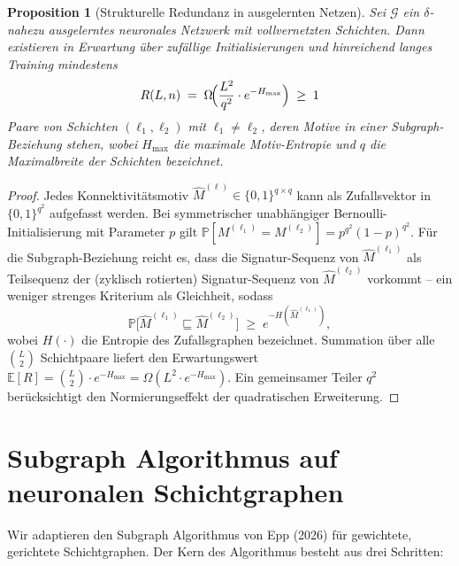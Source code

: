 \documentclass[12pt, a4paper, openany]{report}
\newtheorem{proposition}[theorem]{Proposition}
\newcommand{\E}{\mathbb{E}}
\newcommand{\Prob}{\mathbb{P}}
\newcommand{\calG}{\mathcal{G}}
\begin{document}
\begin{proposition}[Strukturelle Redundanz in ausgelernten Netzen]
\label{prop:redundancy}
Sei $\calG$ ein $\delta$-nahezu ausgelerntes neuronales Netzwerk mit
vollvernetzten Schichten.  Dann existieren in Erwartung über zufällige
Initialisierungen und hinreichend langes Training mindestens
\[
  R(L, n)
  \;=\;
  \Omega\!\Bigl(\frac{L^2}{q^2} \cdot e^{-H_{\max}}\Bigr)
  \;\geq\; 1
\]
Paare von Schichten $(\ell_1, \ell_2)$ mit $\ell_1 \neq \ell_2$, deren
Motive in einer Subgraph-Beziehung stehen, wobei $H_{\max}$ die maximale
Motiv-Entropie und $q$ die Maximalbreite der Schichten bezeichnet.
\end{proposition}

\begin{proof}
Jedes Konnektivitätsmotiv $\hat{M}^{(\ell)} \in \{0,1\}^{q\times q}$ kann
als Zufallsvektor in $\{0,1\}^{q^2}$ aufgefasst werden.  Bei symmetrischer
unabhängiger Bernoulli-Initialisierung mit Parameter $p$ gilt
$\Prob[M^{(\ell_1)} = M^{(\ell_2)}] = p^{q^2}(1-p)^{q^2}$.  Für die
Subgraph-Beziehung reicht es, dass die Signatur-Sequenz von $\hat{M}^{(\ell_1)}$
als Teilsequenz der (zyklisch rotierten) Signatur-Sequenz von $\hat{M}^{(\ell_2)}$
vorkommt -- ein weniger strenges Kriterium als Gleichheit, sodass
\[
  \Prob\!\bigl[\hat{M}^{(\ell_1)} \sqsubseteq \hat{M}^{(\ell_2)}\bigr]
  \;\geq\; e^{-H(\hat{M}^{(\ell_1)})},
\]
wobei $H(\cdot)$ die Entropie des Zufallsgraphen bezeichnet.
Summation über alle $\binom{L}{2}$ Schicht\-paare liefert den Erwartungswert
$\E[R] = \binom{L}{2} \cdot e^{-H_{\max}} = \Omega(L^2 \cdot e^{-H_{\max}})$.
Ein gemeinsamer Teiler $q^2$ berücksichtigt den Normierungseffekt der
quadratischen Erweiterung.
\end{proof}

\section{Subgraph Algorithmus auf neuronalen Schichtgraphen}
\label{sec:sgkr_algo}

Wir adaptieren den Subgraph Algorithmus von Epp (2026) für gewichtete,
gerichtete Schichtgraphen.  Der Kern des Algorithmus besteht aus drei
Schritten:
\end{document}
